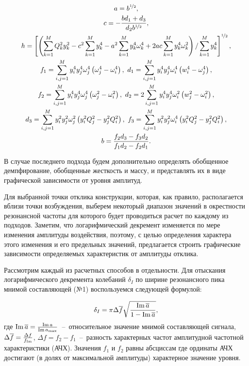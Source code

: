\begin{equation}
	\begin{gathered}
		a = b ^ {\nicefrac{1}{2}}, \\
		c = -\frac{b d_1 + d_3}{d_2 b ^ {\nicefrac{1}{2}}}, \\
		h = \left[ \left( \sum_{k = 1} ^ M Q_k ^ 2 y_k ^ 2 - c ^ 2 \sum_{k = 1} ^ M y_k ^ 4 - a ^ 2 \sum_{k = 1} ^ M y_k ^ 4 \omega_k ^ 4 + 2 a c \sum_{k = 1} ^ M y_k ^ 4 \omega_k ^ 2 \right) / \sum_{k = 1} ^ M y_k ^ 4 \right] ^ {\nicefrac{1}{2}}, \\ 
		f_1 = \sum_{i, j = 1} ^ M y_i ^ 4 y_j ^ 4 \omega_j ^ 4 \left( \omega_j ^ 4 - \omega_i ^ 4 \right), \ d_1 = \sum_{i, j = 1} ^ M y_i ^ 4 y_j ^ 4 \omega_i ^ 4 \left( w_i ^ 4 - \omega_j ^ 4 \right), \\
		f_2 = \sum_{i, j = 1} ^ M y_i ^ 4 y_j ^ 4 \omega_j ^ 4 \left( \omega_j ^ 2 - \omega_i ^ 2 \right), \ d_2 = 2 \sum_{i, j = 1} ^ M y_i ^ 4 y_j ^ 4 \omega_i ^ 2 \left( w_j ^ 2 - \omega_i ^ 2 \right), \\
		d_3 = \sum_{i, j = 1} ^ M y_i ^ 2 y_j ^ 2 \omega_j ^ 2 \left( y_i ^ 2 Q_j ^ 2 - y_j ^ 2 Q_i ^ 2 \right), \ f_3 = \sum_{i, j = 1} ^ M y_i ^ 2 y_j ^ 2 \omega_i ^ 4 \left( y_i ^ 2 Q_j ^ 2 - y_j ^ 2 Q_i ^ 2 \right), \\
		b = \frac{f_2 d_3 - f_3 d_2}{f_1 d_2 - f_2 d_1}.
	\end{gathered}
	\label{eq:generalSolution}
\end{equation}

В случае последнего подхода будем дополнительно определять обобщенное демпфирование, обобщенные жесткость и массу, и представлять их в виде графической зависимости от уровня амплитуд.

Для выбранной точки отклика конструкции, которая, как правило, располагается вблизи точки возбуждения, выберем некоторый диапазон значений в окрестности резонансной частоты для которого будет проводиться расчет по каждому из подходов. Заметим, что логарифмический декремент изменяется по мере изменения амплитуды воздействия, поэтому, с целью определения характера этого изменения и его предельных значений, предлагается
строить графические зависимости определяемых характеристик от амплитуды отклика.

Рассмотрим каждый из расчетных способов в отдельности. Для отыскания логарифмического декремента колебаний $\delta_I$ по ширине резонансного пика мнимой составляющей (№1) воспользуемся следующей формулой:

\begin{equation}
	\delta_I = \pi \Delta \overline{f} \sqrt{\frac{\operatorname{Im} \overline{a}}{1 - \operatorname{Im} \overline{a}}}, \label{eq:decrementWidthImaginaryPeak}
\end{equation}
где $ \operatorname{Im} \overline{a} = \frac{\operatorname{Im} a}{\operatorname{Im} a_{\max}} $~--~относительное значение мнимой составляющей сигнала, $ \Delta \overline{f} = \frac{\Delta f}{f_{\operatorname{Im}}}$, $ \Delta f = f_2 - f_1 $~--~разность характерных частот амплитудной частотной характеристики (АЧХ). Значения $ f_1 $ и $ f_2 $ равны абсциссам где ординаты АЧХ достигают (в долях от максимальной амплитуды) характерное значение уровня.

